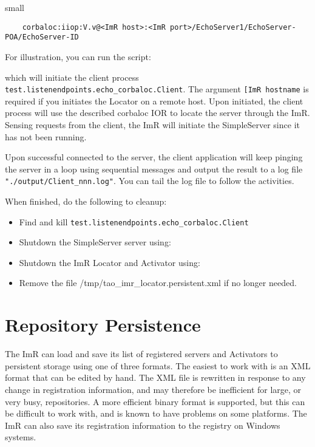 \begin{itemize}
{\begin{itemize}
{small{
\begin{verbatim}
    corbaloc:iiop:V.v@<ImR host>:<ImR port>/EchoServer1/EchoServer-POA/EchoServer-ID
\end{verbatim}
}

For illustration, you can run the script:


which will initiate the client process {\tt test.listenendpoints.echo_corbaloc.Client}.
The argument {\tt [ImR hostname} is required if you initiates the Locator on a
remote host.  Upon initiated, the client process will use the described corbaloc 
IOR to locate the server through the ImR.  Sensing requests from the client, 
the ImR will initiate the SimpleServer since it has not been running.

Upon successful connected to the server, the client application will keep pinging 
the server in a loop using sequential messages and output the result to a log file 
{\tt"./output/Client\_nnn.log"}.  You can tail the log file to follow the activities.

When finished, do the following to cleanup:

\begin{itemize}
    \item Find and kill {\tt test.listenendpoints.echo_corbaloc.Client}
    \item Shutdown the SimpleServer server using:


    \item Shutdown the ImR Locator and Activator using:


    \item Remove the file /tmp/tao\_imr\_locator.persistent.xml if no longer needed.
\end{itemize}

\section{Repository Persistence}

The ImR can load and save its list of registered servers and Activators to 
persistent storage using one of three formats. The easiest to work with is 
an XML format that can be edited by hand. The XML file is rewritten in 
response to any change in registration information, and may therefore be 
inefficient for large, or very busy, repositories. A more efficient binary 
format is supported, but this can be difficult to work with, and is known 
to have problems on some platforms. The ImR can also save its registration 
information to the registry on Windows systems. 

}
\end{itemize}}
\end{itemize}
